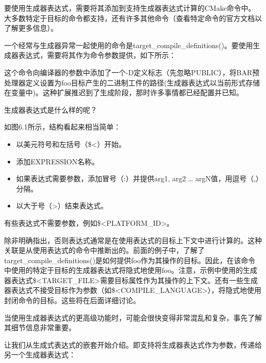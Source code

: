 
要使用生成器表达式，需要将其添加到支持生成器表达式计算的CMake命令中。大多数特定于目标的命令都支持，还有许多其他命令（查看特定命令的官方文档以了解更多信息）。

一个经常与生成器异常一起使用的命令是target\_compile\_definitions()。要使用生成器表达式，需要将其作为命令参数提供，如下所示：


这个命令向编译器的参数中添加了一个-D定义标志（先忽略PUBLIC），将BAR预处理器定义设置为foo目标产生的二进制工件的路径(生成器表达式以当前形式存储在变量中)。这种扩展推迟到了生成阶段，那时许多事情都已经配置并已知。

生成器表达式是什么样的呢？


如图6.1所示，结构看起来相当简单：

\begin{itemize}
\item
以美元符号和左括号（\$<）开始。

\item
添加EXPRESSION名称。

\item
如果表达式需要参数，添加冒号（:）并提供arg1, arg2 … argN值，用逗号（,）分隔。

\item
以大于号（>）结束表达式。
\end{itemize}

有些表达式不需要参数，例如\$<PLATFORM\_ID>。

除非明确指出，否则表达式通常是在使用表达式的目标上下文中进行计算的。这种关联是从使用表达式的命令中推断出的。前面的例子中，了解了target\_compile\_definitions()是如何提供foo作为其操作的目标。因此，在该命令中使用的特定于目标的生成器表达式将隐式地使用foo。注意，示例中使用的生成器表达式\$<TARGET\_FILE>需要目标属性作为其操作的上下文。还有一些生成器表达式不接受目标作为参数（如\$<COMPILE\_LANGUAGE>），将隐式地使用封闭命令的目标。这些将在后面详细讨论。

当使用生成器表达式的更高级功能时，可能会很快变得非常混乱和复杂，事先了解其细节信息非常重要。


让我们从生成式表达式的嵌套开始介绍。即支持将生成器表达式作为参数，传递给另一个生成器表达式：

